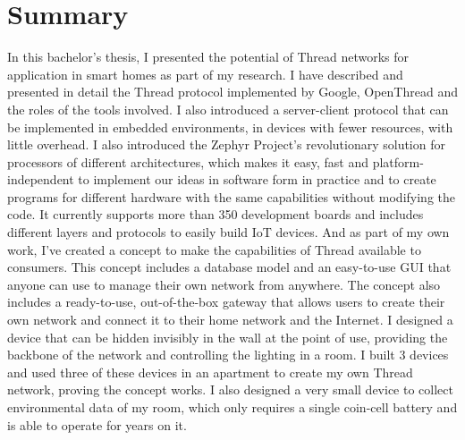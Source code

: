 \section{Summary}
In this bachelor's thesis, I presented the potential of Thread networks for application in smart homes as part of my research. I have described and presented in detail the Thread protocol implemented by Google, OpenThread and the roles of the tools involved. I also introduced a server-client protocol that can be implemented in embedded environments, in devices with fewer resources, with little overhead. I also introduced the Zephyr Project's revolutionary solution for processors of different architectures, which makes it easy, fast and platform-independent to implement our ideas in software form in practice and to create programs for different hardware with the same capabilities without modifying the code. It currently supports more than 350 development boards and includes different layers and protocols to easily build IoT devices. And as part of my own work, I've created a concept to make the capabilities of Thread available to consumers. This concept includes a database model and an easy-to-use GUI that anyone can use to manage their own network from anywhere. The concept also includes a ready-to-use, out-of-the-box gateway that allows users to create their own network and connect it to their home network and the Internet. I designed a device that can be hidden invisibly in the wall at the point of use, providing the backbone of the network and controlling the lighting in a room. I built 3 devices and used three of these devices in an apartment to create my own Thread network, proving the concept works. I also designed a very small device to collect environmental data of my room, which only requires a single coin-cell battery and is able to operate for years on it. 